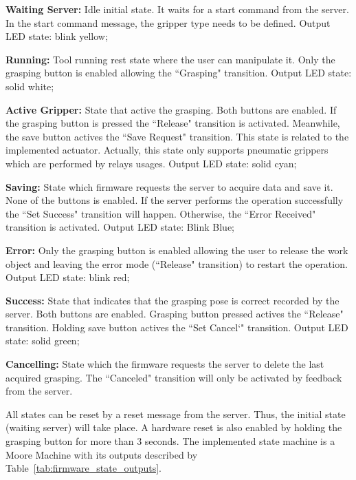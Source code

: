 \begin{itemize_jp}
    \item \textbf{Waiting Server:} Idle initial state. It waits for a start command from the server. In the start command message, the gripper type needs to be defined. Output LED state: blink yellow;

    \item \textbf{Running:} Tool running rest state where the user can manipulate it. Only the grasping button is enabled allowing the ``Grasping" transition. Output LED state: solid white;
    
    \item \textbf{Active Gripper:} State that active the grasping. Both buttons are enabled. If the grasping button is pressed the ``Release" transition is activated. Meanwhile, the save button actives the ``Save Request" transition. This state is related to the implemented actuator. Actually, this state only supports pneumatic grippers which are performed by relays usages.  Output LED state: solid cyan;
    
    \item \textbf{Saving: } State which firmware requests the server to acquire data and save it. None of the buttons is enabled. If the server performs the operation successfully the ``Set Success" transition will happen. Otherwise, the ``Error Received" transition is activated. Output LED state: Blink Blue;
    
    \item \textbf{Error:} Only the grasping button is enabled allowing the user to release the work object and leaving the error mode (``Release" transition) to restart the operation. Output LED state: blink red;
    
    \item \textbf{Success:} State that indicates that the grasping pose is correct recorded by the server. Both buttons are enabled. Grasping button pressed actives the ``Release" transition. Holding save button actives the ``Set Cancel`" transition. Output LED state: solid green;
    
    \item \textbf{Cancelling:} State which the firmware requests the server to delete the last acquired grasping. The ``Canceled" transition will only be activated by feedback from the server. 
    
\end{itemize_jp}

All states can be reset by a reset message from the server. Thus, the initial state (waiting server) will take place. A hardware reset is also enabled by holding the grasping button for more than 3 seconds. The implemented state machine is a Moore Machine with its outputs described by Table~\ref{tab:firmware_state_outputs}.

